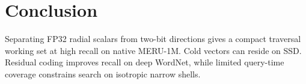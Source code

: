 \section{Conclusion}
\label{sec:conclusion}

Separating FP32 radial scalars from two-bit directions gives \rquiver{} a compact traversal working set at high recall on native MERU-1M. Cold vectors can reside on SSD. Residual coding improves recall on deep WordNet, while limited query-time coverage constrains search on isotropic narrow shells.
